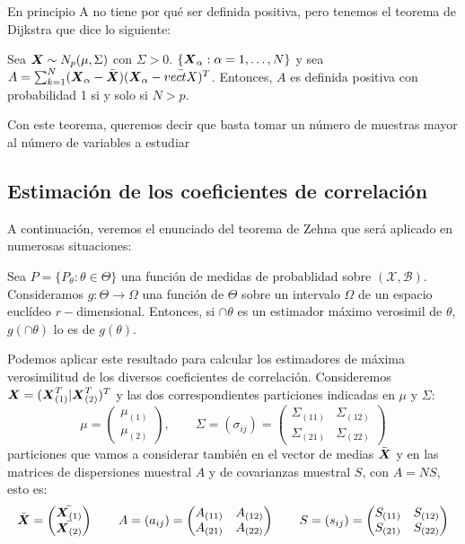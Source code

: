 En principio A no tiene por qué ser definida positiva, pero tenemos el teorema de Dijkstra que dice lo siguiente:

\begin{nth}
Sea $\boldsymbol{X} \sim N_p(\mu,\Sigma)$ con $\Sigma > 0$. $\{\boldsymbol{X}_{\alpha} : \alpha = 1,\dots, N\}$ y sea $A = \sum_{k  =1}^N(\boldsymbol{X}_\alpha - \bar{\boldsymbol{X}})(\boldsymbol{X}_\alpha - \bar{vectX})^T$. Entonces, $A$ es definida positiva con probabilidad 1 si y solo si $N> p$.
  \end{nth}
\begin{nota}
Con este teorema, queremos decir que basta tomar un número de muestras mayor al número de variables a estudiar
\end{nota}

\subsection{Estimación de los coeficientes de correlación}

A continuación, veremos el enunciado del teorema de Zehna que será aplicado en numerosas situaciones:

\begin{nth}[Zehna]
Sea $P = \{P_\theta : \theta \in \Theta\}$ una función de medidas de probablidad sobre $(\mathcal X, \mathcal B)$. Consideramos $g: \Theta \to \Omega$ una función de $\Theta$ sobre un intervalo $\Omega$ de un espacio euclídeo $r-$dimensional. Entonces, si $\cap{\theta}$ es un estimador máximo verosimil de $\theta$, $g(\cap{\theta})$ lo es de $g(\theta)$.
\end{nth}

Podemos aplicar este resultado para calcular los estimadores de máxima verosimilitud de los diversos coeficientes de correlación. Consideremos $\boldsymbol{X} = (\boldsymbol{X}_{(1)}^T | \boldsymbol{X}_{(2)}^T)^T$ y las dos correspondientes particiones indicadas en $\mu$ y $\Sigma$:
\[
\mu = \begin{pmatrix} \mu_{(1)} \\ \mu_{(2)}\end{pmatrix}, \qquad \Sigma = (\sigma_{ij}) =  \begin{pmatrix} \Sigma_{(11)} & \Sigma_{(12)} \\ \Sigma_{(21)} & \Sigma_{(22)}\end{pmatrix}
\]
particiones que vamos a considerar también en el vector de medias $\bar{\boldsymbol{X}}$ y en las matrices de dispersiones muestral $A$ y de covarianzas muestral $S$, con $A = NS$, esto es:
\[
\bar{\boldsymbol{X}} =  \begin{pmatrix}\bar{\boldsymbol{X}_{(1)}} \\ \bar{\boldsymbol{X}_{(2)}}\end{pmatrix}
\qquad A = (a_{ij}) = \begin{pmatrix}A_{(11)} & A_{(12)} \\ A_{(21)} & A_{(22)} \end{pmatrix}
  \qquad S = (s_{ij}) = \begin{pmatrix}S_{(11)} & S_{(12)} \\ S_{(21)} & S_{(22)} \end{pmatrix}
\]

